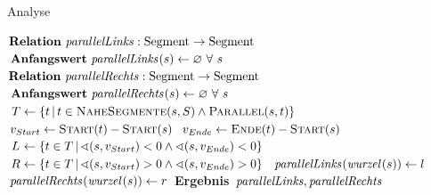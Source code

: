 \documentclass[../main/thesis.tex]{subfiles}
\begin{document}

\begin{algorithmhere}{Analyse}
\label{alg:Analyse}
\begin{algorithmic}
\State $\textbf{Relation}\ \relation{parallelLinks} : \textrm{Segment} \rightarrow \textrm{Segment}$
\State $\textbf{Anfangswert}\ \relation{parallelLinks}[s] \eqdefrel \Nil\ \forall\ s$
\State $\textbf{Relation}\ \relation{parallelRechts} : \textrm{Segment} \rightarrow \textrm{Segment}$
\State $\textbf{Anfangswert}\ \relation{parallelRechts}[s] \eqdefrel \Nil\ \forall\ s$
		\State $T \gets \Set{t \SetCond t \in \textproc{NaheSegmente}(s, S) \wedge \textproc{Parallel}(s, t)}$  %
		\State $v_{Start} \gets \textproc{Start}(t) - \textproc{Start}(s)$
		\State $v_{Ende} \gets \textproc{Ende}(t) - \textproc{Start}(s)$
		\State $\mathtowidth[R]{L} \gets \Set{t \in T \SetCond \sphericalangle (s, v_{Start}) < 0 \wedge \sphericalangle (s, v_{Ende}) < 0}$
		\State $R \gets \{t \in T \,|\, \sphericalangle (s, v_{Start}) > 0 \wedge \sphericalangle (s, v_{Ende}) > 0\}$
		\State{}
		\State{}
				\State $\relation{parallelLinks}[\relation{wurzel}[s]] \gets l$
			\EndIf
		\EndFor
				\State $\relation{parallelRechts}[\relation{wurzel}[s]] \gets r$
			\EndIf
		\EndFor
	\EndFor
	\State \textbf{Ergebnis} $\relation{parallelLinks}, \relation{parallelRechts}$
\EndFunction
\end{algorithmic}
\end{algorithmhere}
\end{document}
